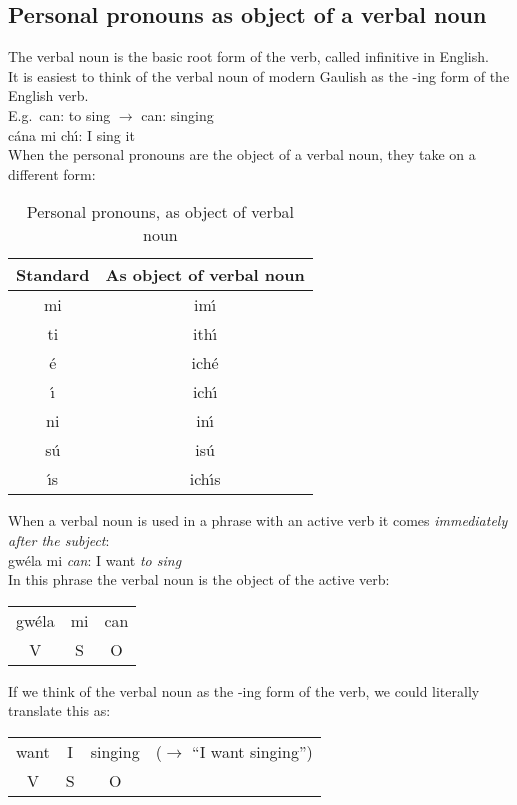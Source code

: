 \subsection{Personal pronouns as object of a verbal noun}

The verbal noun is the basic root form of the verb, called infinitive in English.\\

It is easiest to think of the verbal noun of modern Gaulish as the -ing form of the English verb.\\

E.g.\ can: to sing $\rightarrow$ can: singing\\
c\'{a}na mi ch\'{\i}: I sing it\\

When the personal pronouns are the object of a verbal noun, they take on a different form:
\begin{table}[H]
\centering
\begin{tabu}{c|c}
  \textbf{Standard} & \textbf{As object of verbal noun}\\
  \toprule
  mi & im\'{\i}\\
  ti & ith\'{\i}\\
  \'{e} & ich\'{e}\\
  \'{\i} & ich\'{\i}\\
  ni & in\'{\i}\\
  s\'{u} & is\'{u}\\
  \'{\i}s & ich\'{\i}s
\end{tabu}
\caption{Personal pronouns, as object of verbal noun}
\label{personal_pronouns_as_object_of_verbal_noun}
\end{table}

When a verbal noun is used in a phrase with an active verb it comes \textit{immediately after the subject}:\\

gw\'{e}la mi \textit{can}: I want \textit{to sing}\\

In this phrase the verbal noun is the object of the active verb:
\begin{table}[H]
\begin{tabu}{ccc}
  gw\'{e}la & mi & can\\
  V & S & O
\end{tabu}
\label{verbal_noun_object_of_active_verb}
\end{table}

If we think of the verbal noun as the -ing form of the verb, we could literally translate this as:
\begin{table}[H]
\begin{tabu}{cccc}
  want & I & singing & ($\rightarrow$ ``I want singing'')\\
  V & S & O &
\end{tabu}
\label{verbal_noun_ing_form}
\end{table}

